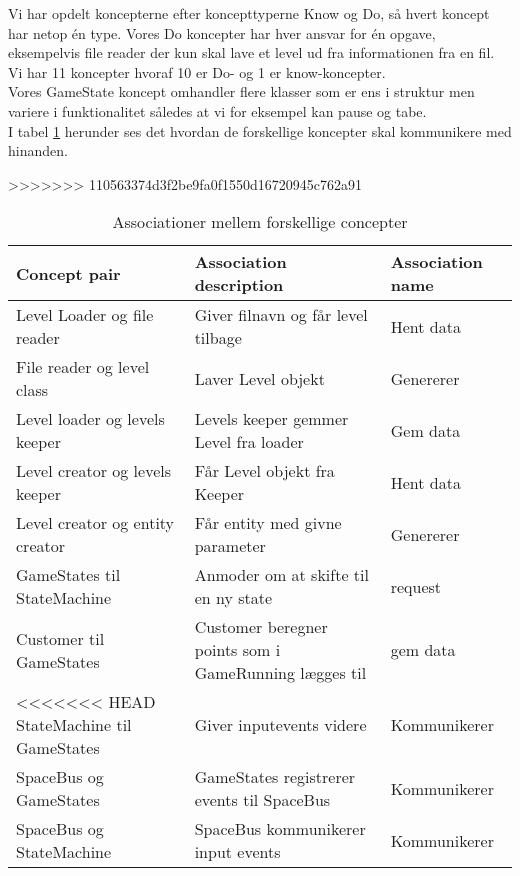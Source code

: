\newpage

Vi har opdelt koncepterne efter koncepttyperne Know og Do, så hvert koncept har netop én type. Vores Do koncepter har hver ansvar for én opgave, eksempelvis file reader der kun skal lave et level ud fra informationen fra en fil. Vi har 11 koncepter hvoraf 10 er Do- og 1 er know-koncepter.\\
Vores GameState koncept omhandler flere klasser som er ens i struktur men variere i funktionalitet således at vi for eksempel kan pause og tabe.\\
I tabel \ref{associations} herunder ses det hvordan de forskellige koncepter skal kommunikere med hinanden.

>>>>>>> 110563374d3f2be9fa0f1550d16720945c762a91
\begin{table}[!h]
\hspace{-60pt}
\begin{tabular}{|l|l|l|}
\hline
\textbf{Concept pair}           & \textbf{Association description}      & \textbf{Association name} \\ \hline
Level Loader og file reader     & Giver filnavn og får level tilbage    & Hent data                 \\ \hline
File reader og level class      & Laver Level objekt                    & Genererer                 \\ \hline
Level loader og levels keeper   & Levels keeper gemmer Level fra loader & Gem data                  \\ \hline
Level creator og levels keeper  & Får Level objekt fra Keeper           & Hent data                 \\ \hline
Level creator og entity creator & Får entity med givne parameter        & Genererer                 \\ \hline
GameStates til StateMachine & Anmoder om at skifte til en ny state & request \\ \hline
Customer til GameStates & Customer beregner points som i GameRunning lægges til & gem data \\ \hline
<<<<<<< HEAD
StateMachine til GameStates & Giver inputevents videre & Kommunikerer \\\hline
SpaceBus og GameStates & GameStates registrerer events til SpaceBus & Kommunikerer\\\hline
SpaceBus og StateMachine & SpaceBus kommunikerer input events & Kommunikerer \\\hline
\end{tabular}
\caption{Associationer mellem forskellige concepter}
\label{associations}
\end{table}\\
